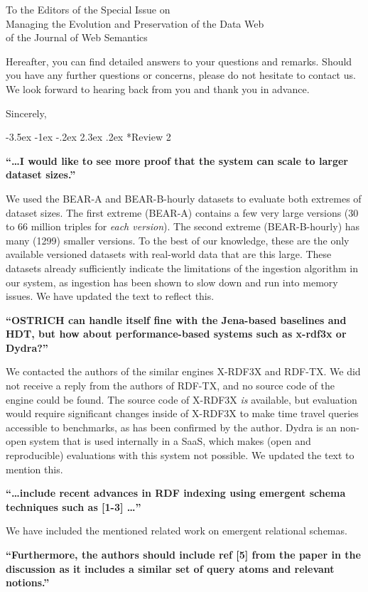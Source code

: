 \documentclass{letter}
\makeatletter
\newcounter{section}
\newcommand\section{\@startsection {section}{1}{\z@}%
                                   {-3.5ex \@plus -1ex \@minus -.2ex}%
                                   {2.3ex \@plus.2ex}%
                                   {\normalfont\Large\bfseries}}
\makeatother
\begin{document}
\begin{letter}{To the Editors of the Special Issue on\\Managing the Evolution and Preservation of the Data Web\\of the Journal of Web Semantics}
\clearpage

Hereafter, you can find detailed answers to your questions and remarks.
Should you have any further questions or concerns, please do not hesitate to contact us.
We look forward to hearing back from you and thank you in advance.

\bigskip

\closing{Sincerely,}

\pagebreak
\section*{Review 2}

\textbf{\enquote{\ldots I would like to see more proof that the system can scale to larger dataset sizes.}}

We used the BEAR-A and BEAR-B-hourly datasets to evaluate both extremes of dataset sizes.
The first extreme (BEAR-A) contains a few very large versions (30 to 66 million triples for \emph{each version}).
The second extreme (BEAR-B-hourly) has many (1299) smaller versions.
To the best of our knowledge, these are the only available versioned datasets with real-world data
that are this large.
These datasets already sufficiently indicate the limitations of the ingestion algorithm in our system,
as ingestion has been shown to slow down and run into memory issues.
We have updated the text to reflect this.

\textbf{\enquote{OSTRICH can handle itself fine with the Jena-based baselines and HDT, but how about performance-based systems such as x-rdf3x or Dydra?}}

We contacted the authors of the similar engines X-RDF3X and RDF-TX.
We did not receive a reply from the authors of RDF-TX, and no source code of the engine could be found.
The source code of X-RDF3X \emph{is} available, but evaluation would require significant changes inside of X-RDF3X
to make time travel queries accessible to benchmarks, as has been confirmed by the author.
Dydra is an non-open system that is used internally in a SaaS, which makes (open and reproducible) evaluations with this system not possible.
We updated the text to mention this.

\textbf{\enquote{\ldots include recent advances in RDF indexing using emergent schema techniques such as [1-3] \ldots}}

We have included the mentioned related work on emergent relational schemas.

\textbf{\enquote{Furthermore, the authors should include ref [5] from the paper in the discussion as it includes a similar set of query atoms and relevant notions.}}


\end{letter}
\end{document}
